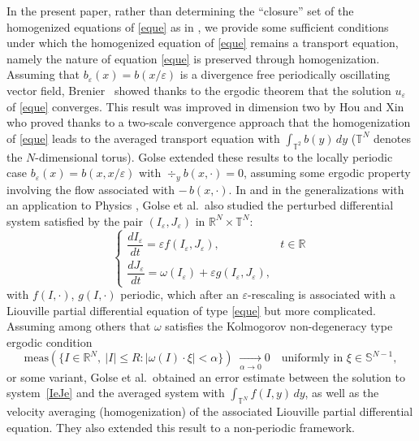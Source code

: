 \documentclass[11pt]{article}
\let\al\alpha
\def \RR {\mathbb R}
\def \Ss {\mathbb S}
\def \TT {\mathbb T}
\theoremstyle{plain}
\theoremstyle{definition}
\numberwithin{equation}{section}
\begin{document}
In the present paper, rather than determining the ``closure'' set of the homogenized equations of \eqref{eque} as in \cite{AHZ1,AHZ2,AHZ3}, we provide some sufficient conditions under which the homogenized equation of \eqref{eque} remains a transport equation, namely the nature of equation \eqref{eque} is preserved through homogenization.
Assuming that $b_\varepsilon(x)=b(x/\varepsilon)$ is a divergence free periodically oscillating vector field, Brenier~\cite{Bre} showed thanks to the ergodic theorem that the solution $u_\varepsilon$ of \eqref{eque} converges. This result was improved in dimension two by Hou and Xin \cite{HoXi} who proved thanks to a two-scale convergence approach that the homogenization of \eqref{eque} leads to the averaged transport equation with $\int_{\TT^2}b(y)\,dy$ ($\TT^N$ denotes the $N$-dimensional torus). Golse \cite[Th.\,8]{Gol1} extended these results to the locally periodic case $b_\varepsilon(x)=b(x,x/\varepsilon)$ with $\div_yb(x,\cdot)=0$, assuming some ergodic property involving the flow associated with $-\,b(x,\cdot)$. In \cite{Gol1,Gol2} and in the generalizations \cite{DGL,DuGo} with an application to Physics \cite{DEG}, Golse et al.\ also studied the perturbed differential system satisfied by the pair $(I_\varepsilon,J_\varepsilon)$ in $\RR^N\times\TT^N$:
\begin{equation}\label{IeJe}
\begin{cases}
\dfrac{d I_\varepsilon}{dt}=\varepsilon f(I_\varepsilon,J_\varepsilon), & t\in\RR
\\[8pt]
\dfrac{d J_\varepsilon}{dt}=\omega(I_\varepsilon)+\varepsilon g(I_\varepsilon,J_\varepsilon),
\end{cases}
\end{equation}
with $f(I,\cdot)$, $g(I,\cdot)$ periodic, which after an $\varepsilon$-rescaling is associated with a Liouville partial differential equation of type \eqref{eque} but more complicated. Assuming among others that $\omega$ satisfies the Kolmogorov non-degeneracy type ergodic condition
\begin{equation}\label{ergK}
\mbox{meas}\left(\big\{I\in\RR^N,\ |I|\leq R:|\omega(I)\cdot\xi|<\al\big\}\right)\;\xrightarrow[\al\to 0]\; 0\quad\mbox{uniformly in }\xi\in\Ss^{N-1},
\end{equation}
or some variant, Golse et al.\ obtained an error estimate between the solution to system~\eqref{IeJe} and the averaged system with $\int_{\TT^N}f(I,y)\,dy$, as well as the velocity averaging (homogenization) of the associated Liouville partial differential equation. They also extended this result to a non-periodic framework.
\end{document}
